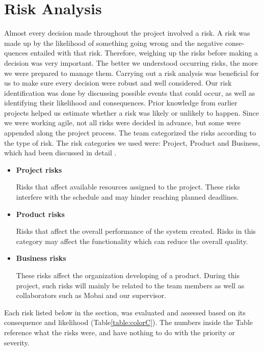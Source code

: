 \section{Risk Analysis} 
Almost every decision made throughout the project involved a risk. A risk was made up by the likelihood of something going wrong and the negative conse-quences entailed with that risk. Therefore, weighing up the risks before making a decision was very important. The better we understood occurring risks, the more we were prepared to manage them. Carrying out a risk analysis was beneficial for us to make sure every decision were robust and well considered. Our risk identification was done by discussing possible events that could occur, as well as identifying their likelihood and consequences. Prior knowledge from earlier projects helped us estimate whether a risk was likely or unlikely to happen. Since we were working agile, not all risks were decided in advance, but some were appended along the project process. The team categorized the risks according to the type of risk. The risk categories we used were: Project, Product and Business, which had been discussed in  detail \cite{RiskAnalysis}. 

\begin{itemize}
    \item \textbf{Project risks} 
        \par \hspace{0,5cm} Risks that affect available resources assigned to the project. These risks interfere with the schedule and may hinder reaching planned deadlines. 
    \item \textbf{Product risks} 
        \par \hspace{0,5cm} Risks that affect the overall performance of the system created. Risks in this category may affect the functionality which can reduce the overall quality. 
    \item \textbf{Business risks}
        \par \hspace{0,5cm} These risks affect the organization developing of a product. During this project, such risks will mainly be related to the team members as well as collaborators such as Mobai and our supervisor. 
\end{itemize}

Each risk listed below in the section, was evaluated and assessed based on its consequence and likelihood (Table\ref{table:colorC}). The numbers inside the Table reference what the risks were, and have nothing to do with the priority or severity. 
    
